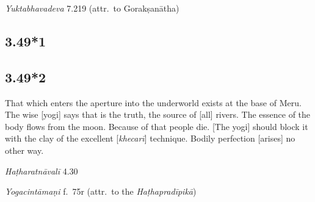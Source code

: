 \begin{ekdosis}
\begin{testimonia}[hp03_049]
\emph{Yuktabhavadeva} 7.219 (attr.~to Gorakṣanātha)
\begin{versinnote}
\end{versinnote}
\end{testimonia}


\subsection*{3.49*1}


\subsection*{3.49*2}
\begin{translation}[hp03_049_2]
That which enters the aperture into the underworld exists at the base of Meru. The wise [yogi] says that is the truth, the source of [all] rivers. The essence of the body flows from the moon. Because of that people die. [The yogi] should block it with the clay of the excellent [\emph{khecarī}] technique. Bodily perfection [arises] no other way.
\end{translation}%


\begin{testimonia}[hp03_049_2]
\emph{Haṭharatnāvalī} 4.30
\begin{versinnote}
\end{versinnote}

\emph{Yogacintāmaṇi} f.~75r (attr.~to the \emph{Haṭhapradīpikā})
\begin{versinnote}
\end{versinnote}



\end{testimonia}
\end{ekdosis}
